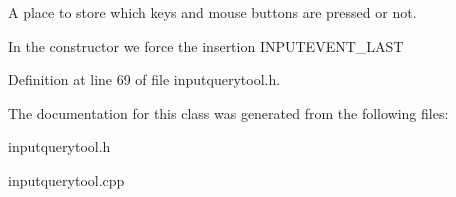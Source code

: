 A place to store which keys and mouse buttons are pressed or not. 

In the constructor we force the insertion INPUTEVENT\_\-LAST 

Definition at line 69 of file inputquerytool.h.



The documentation for this class was generated from the following files:\begin{DoxyCompactItemize}
\item 
inputquerytool.h\item 
inputquerytool.cpp\end{DoxyCompactItemize}
